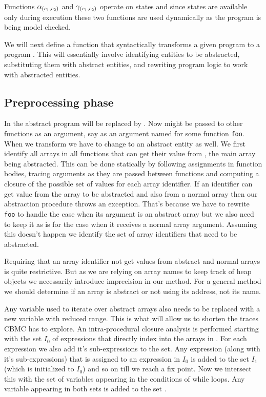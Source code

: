 Functions \(\alpha_{(c_1,c_2)}\) and \(\gamma_{(c_1,c_2)}\) operate on states and since states are
available only during execution these two functions are used
dynamically as the program is being model checked.

We will next define a function \tr{} that syntactically transforms a
given program \prog{} to a program \progabst. This will essentially involve
identifying entities to be abstracted, substituting them with abstract
entities, and rewriting program logic to work with abstracted
entities.

\subsection{Preprocessing phase}

In the abstract program \aid{} will be replaced by \aabstid{}. Now
\aabstid{} might be passed to other functions as an argument, say as
an argument named \aargid{} for some function {\tt foo}. When we
transform \prog{} we have to change \aargid{} to an abstract entity as
well. We first identify all arrays in all functions that can get their
value from \aid{}, the main array being abstracted. This can be done
statically by following assignments in function bodies, tracing
arguments as they are passed between functions and computing a closure
of the possible set of values for each array identifier. If an
identifier \aargid{} can get value from the array to be abstracted
and also from a normal array then our abstraction procedure throws an
exception. That's because we have to rewrite {\tt foo} to handle the case
when its argument is an abstract array but we also need to keep it as
is for the case when it receives a normal array argument. Assuming
this doesn’t happen we identify the set \arrayids{} of array
identifiers that need to be abstracted.

\begin{remark}
Requiring that an array identifier not get values from abstract and normal
arrays is quite restrictive. But as we are relying on array
names to keep track of heap objects we necessarily introduce
imprecision in our method. For a general method we should
determine if an array is abstract or not using its address, not its
name.
\end{remark}

Any variable used to iterate over abstract arrays also needs to be
replaced with a new variable with reduced range. This is what will
allow us to shorten the traces CBMC has to explore. An
intra-procedural closure analysis is performed starting with the set
\(I_0\) of expressions that directly index into the arrays in
\arrayids. For each expression we also add it's sub-expressions to the
set. Any expression (along with it's sub-expressions) that is assigned
to an expression in \(I_0\) is added to the set \(I_1\) (which is
initialized to \(I_0\)) and so on till we reach a fix point. Now we
intersect this with the set of variables appearing in the conditions
of while loops. Any variable appearing in both sets is added to the
set \indexids.

